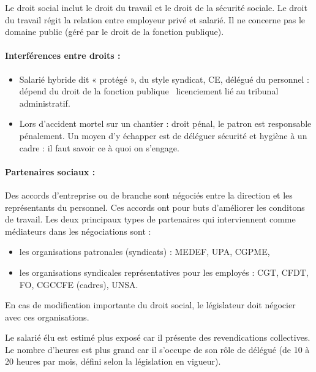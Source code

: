 Le droit social inclut le droit du travail et le droit de la sécurité sociale.
Le droit du travail régit la relation entre employeur privé et salarié.
Il ne concerne pas le domaine public (géré par le droit de la fonction publique).

\paragraph{Interférences entre droits :}
	\noindent\begin{itemize}
		\item[\textbullet] Salarié hybride dit « protégé », du style syndicat, CE, délégué du personnel : dépend du droit de la fonction publique \textrightarrow\ licenciement lié au tribunal administratif.
		\item[\textbullet] Lors d’accident mortel sur un chantier : droit pénal, le patron est responsable pénalement. Un moyen d'y échapper est de déléguer sécurité et hygiène à un cadre : il faut savoir ce à quoi on s'engage.
	\end{itemize}

\paragraph{Partenaires sociaux :}
	Des accords d'entreprise ou de branche sont négociés entre la direction et les représentants du personnel.
	Ces accords ont pour buts d'améliorer les conditons de travail.
	Les deux principaux types de partenaires qui interviennent comme médiateurs dans les négociations sont :
	\begin{itemize}
		\item[\textbullet] les organisations patronales (syndicats) : MEDEF, UPA, CGPME,
		\item[\textbullet] les organisations syndicales représentatives pour les employés : CGT, CFDT, FO, CGCCFE (cadres), UNSA.
	\end{itemize}
	En cas de modification importante du droit social, le législateur doit négocier avec ces organisations.

	Le salarié élu est estimé plus exposé car il présente des revendications collectives.
	Le nombre d'heures est plus grand car il s'occupe de son rôle de délégué (de 10 à 20 heures par mois, défini selon la législation en vigueur).
